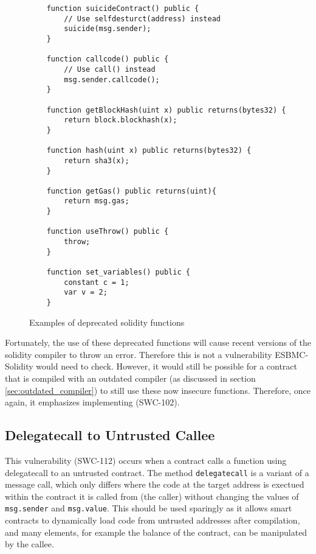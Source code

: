 \begin{figure}
\begin{lstlisting}
    function suicideContract() public {
        // Use selfdesturct(address) instead
        suicide(msg.sender);
    }

    function callcode() public {
        // Use call() instead
        msg.sender.callcode();
    }

    function getBlockHash(uint x) public returns(bytes32) {
        return block.blockhash(x);
    }

    function hash(uint x) public returns(bytes32) {
        return sha3(x);
    }

    function getGas() public returns(uint){
        return msg.gas;
    }

    function useThrow() public {
        throw;
    }

    function set_variables() public {
        constant c = 1;
        var v = 2;
    }
\end{lstlisting}
\caption{Examples of deprecated solidity functions}
\label{fig:deprecated_solidity_functions}
\end{figure}

Fortunately, the use of these deprecated functions will cause recent versions of the solidity compiler to throw an error. Therefore this is not a vulnerability ESBMC-Solidity would need to check. However, it would still be possible for a contract that is compiled with an outdated compiler (as discussed in section \ref{sec:outdated_compiler}) to still use these now insecure functions. Therefore, once again, it emphasizes implementing (SWC-102).

\subsection{Delegatecall to Untrusted Callee}
\label{sec:delegatecall_to_untrusted_callee}

This vulnerability (SWC-112) occurs when a contract calls a function using delegatecall to an untrusted contract. The method \verb|delegatecall| is a variant of a message call, which only differs where the code at the target address is exectued within the contract it is called from (the caller) without changing the values of \verb|msg.sender| and \verb|msg.value|. This should be used sparingly as it allows smart contracts to dynamically load code from untrusted addresses after compilation, and many elements, for example the balance of the contract, can be manipulated by the callee. 


